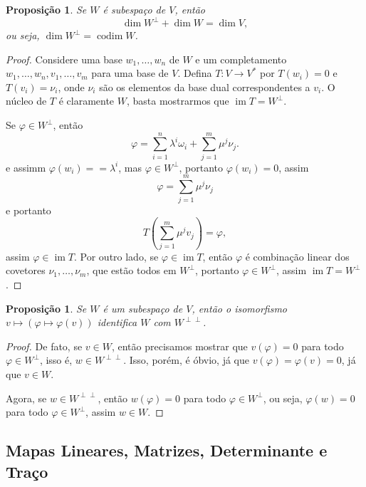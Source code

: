 \documentclass{article}
\newtheorem{proposition}[definition]{Proposição}
\DeclareMathOperator{\im}{im}
\DeclareMathOperator{\codim}{codim}
\renewcommand{\phi}{\varphi}
\begin{document}
\begin{proposition}
    Se $W$ é subespaço de $V$, então \begin{equation}
        \dim W^\perp + \dim W = \dim V,
    \end{equation} ou seja, $\dim W^\perp = \codim W$.
\end{proposition}
\begin{proof}
    Considere uma base $w_1, \dots, w_n$ de $W$ e um completamento $w_1, \dots, w_n, v_1, \dots, v_m$ para uma base de $V$. Defina $T \colon V \to V^*$ por $T(w_i) = 0$ e $T(v_i) = \nu_i$, onde $\nu_i$ são os elementos da base dual correspondentes a $v_i$. O núcleo de $T$ é claramente $W$, basta mostrarmos que $\im T = W^\perp$.

    Se $\phi \in W^\perp$, então \begin{equation}
        \phi = \sum_{i = 1}^n \lambda^i \omega_i + \sum_{j = 1}^m \mu^j \nu_j.
    \end{equation} e assimm $\phi(w_i) == \lambda^i$, mas $\phi \in W^\perp$, portanto $\phi(w_i) = 0$, assim \begin{equation}
        \phi = \sum_{j = 1}^m \mu^j \nu_j
    \end{equation} e portanto \begin{equation}
        T\left(\sum_{j = 1}^m \mu^j v_j\right) = \phi,
    \end{equation} assim $\phi \in \im T$. Por outro lado, se $\phi \in \im T$, então $\phi$ é combinação linear dos covetores $\nu_1, \dots, \nu_m$, que estão todos em $W^\perp$, portanto $\phi \in W^\perp$, assim $\im T = W^\perp$.
\end{proof}

\begin{proposition}
    Se $W$ é um subespaço de $V$, então o isomorfismo $v \mapsto (\phi \mapsto \phi(v))$ identifica $W$ com $W^{\perp \perp}$.
\end{proposition}
\begin{proof}
    De fato, se $v \in W$, então precisamos mostrar que $v(\phi) = 0$ para todo $\phi \in W^\perp$, isso é, $w \in W^{\perp\perp}$. Isso, porém, é óbvio, já que $v(\phi) = \phi(v) = 0$, já que $v \in W$.

    Agora, se $w \in W^{\perp\perp}$, então $w(\phi) = 0$ para todo $\phi \in W^\perp$, ou seja, $\phi(w) = 0$ para todo $\phi \in W^\perp$, assim $w \in W$.
\end{proof}

\subsection{Mapas Lineares, Matrizes, Determinante e Traço}
\end{document}
